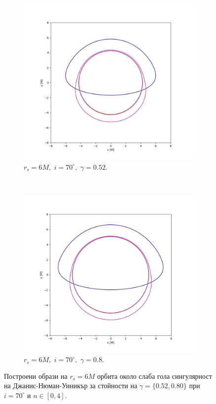 \begin{figure}[!htb]
	\centering
	\begin{subfigure}{6cm}
		\includegraphics[scale = 0.3]{JNW_70_deg_r6_gamma_0.52.png}
		\caption{$r_s = 6M,\,\, i = 70^\circ,\,\,\gamma = 0.52$.} 
	\end{subfigure}\,\,\,
	\begin{subfigure}{6cm}
		\includegraphics[scale = 0.3]{JNW_70_deg_r6_gamma_0.8.png}
		\caption{$r_s = 6M,\,\, i = 70^\circ,\,\,\gamma = 0.8$.}
	\end{subfigure}
	\caption[Построени образи на $r_s = 6M$ орбита около слаба гола сингулярност на Джанис-Нюман-Уиникър за различни стойности на $\gamma$ при $i = 70^\circ$.]{\small Построени образи на $r_s = 6M$ орбита около слаба гола сингулярност на Джанис-Нюман-Уиникър за стойности на $\gamma = \{0.52, 0.80\}$ при $i = 70^\circ$ и $n\in[0,4]$.} 
	\label{JNW_r6_70_deg}
\end{figure}

